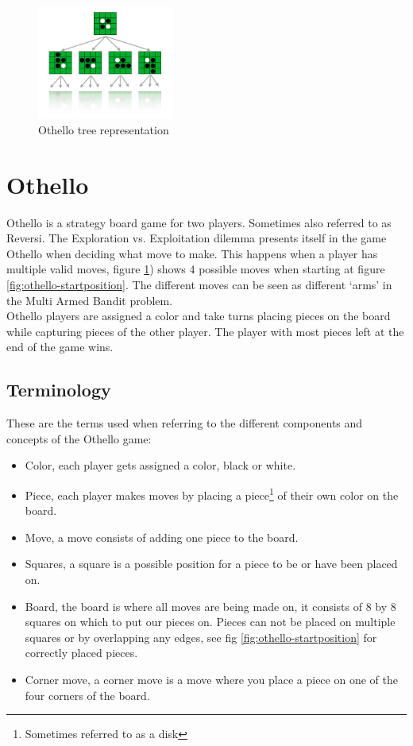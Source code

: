 \documentclass[11pt,a4paper]{article}
\begin{document}
\begin{figure}[H]
	\centering
	\includegraphics[width=0.4\textwidth]{images/othello-gametree}
	\caption{Othello tree representation}
	\label{fig:othello-gametree}
\end{figure}
\section{Othello}
Othello is a strategy board game for two players. Sometimes also referred to as Reversi. The Exploration vs. Exploitation dilemma presents itself in the game Othello when deciding what move to make. This happens when a player has multiple valid moves, figure \ref{fig:othello-gametree}) shows 4 possible moves when starting at figure \ref{fig:othello-startposition}. The different moves can be seen as different `arms' in the Multi Armed Bandit problem.\\
Othello players are assigned a color and take turns placing pieces on the board while capturing pieces of the other player. The player with most pieces left at the end of the game wins.
\subsection{Terminology}
These are the terms used when referring to the different components and concepts of the Othello game:
\begin{itemize}
	\item Color, each player gets assigned a color, black or white.
	\item Piece, each player makes moves by placing a piece\footnote{Sometimes referred to as a disk} of their own color on the board.
	\item Move, a move consists of adding one piece to the board.
	\item Squares, a square is a possible position for a piece to be or have been placed on. 
	\item Board, the board is where all moves are being made on, it consists of 8 by 8 squares on which to put our pieces on. Pieces can not be placed on multiple squares or by overlapping any edges, see fig \ref{fig:othello-startposition} for correctly placed pieces.
	\item Corner move, a corner move is a move where you place a piece on one of the four corners of the board.

\end{itemize}
\end{document}
